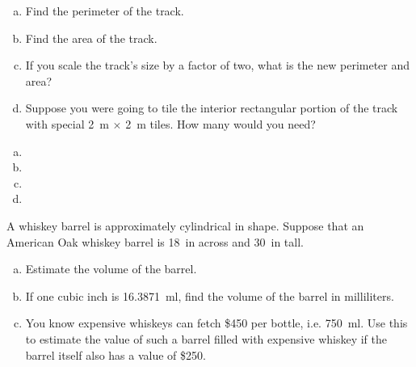\documentclass[11pt,letterpaper]{article}
\begin{document}
\begin{enumerate}[(a)]
\item Find the perimeter of the track.
\item Find the area of the track.
\item If you scale the track's size by a factor of two, what is the new perimeter and area?
\item Suppose you were going to tile the interior rectangular portion of the track with special 2~m $\times$ 2~m tiles. How many would you need?
\end{enumerate} \pspace

\sol 
\begin{enumerate}[(a)]
\item 
\item 
\item 
\item 
\end{enumerate}



\newpage



 A whiskey barrel is approximately cylindrical in shape. Suppose that an American Oak whiskey barrel is 18~in across and 30~in tall.
	\begin{enumerate}[(a)]
	\item Estimate the volume of the barrel. 
	\item If one cubic inch is 16.3871~ml, find the volume of the barrel in milliliters. 
	\item You know expensive whiskeys can fetch \$450 per bottle, i.e. 750~ml. Use this to estimate the value of such a barrel filled with expensive whiskey if the barrel itself also has a value of \$250.
	\end{enumerate} \pspace
\end{document}
